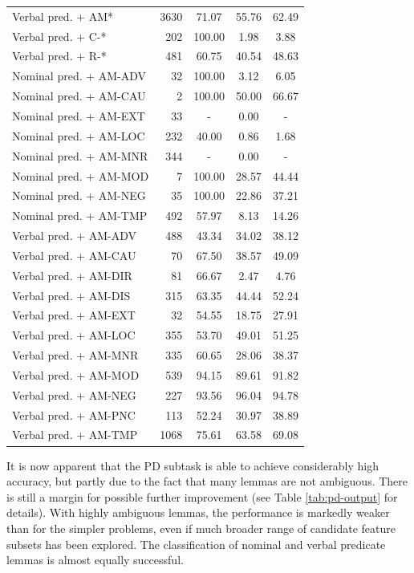 \documentclass[12pt,notitlepage]{report}
\begin{document}
\begin{table}[p]
\begin{center}
\begin{tabular}{|l|r|c|c|c|}
Verbal pred. + AM* & 3630 & 71.07 & 55.76 & 62.49 \\
Verbal pred. + C-* & 202 & 100.00 & 1.98 & 3.88 \\
Verbal pred. + R-* & 481 & 60.75 & 40.54 & 48.63 \\\hline\hline
Nominal pred. + AM-ADV & 32 & 100.00 & 3.12 & 6.05 \\
Nominal pred. + AM-CAU & 2 & 100.00 & 50.00 & 66.67 \\
Nominal pred. + AM-EXT & 33 & - & 0.00 & - \\
Nominal pred. + AM-LOC & 232 & 40.00 & 0.86 & 1.68 \\
Nominal pred. + AM-MNR & 344 & - & 0.00 & - \\
Nominal pred. + AM-MOD & 7 & 100.00 & 28.57 & 44.44 \\
Nominal pred. + AM-NEG & 35 & 100.00 & 22.86 & 37.21 \\
Nominal pred. + AM-TMP & 492 & 57.97 & 8.13 & 14.26 \\\hline
Verbal pred. + AM-ADV & 488 & 43.34 & 34.02 & 38.12 \\
Verbal pred. + AM-CAU & 70 & 67.50 & 38.57 & 49.09 \\
Verbal pred. + AM-DIR & 81 & 66.67 & 2.47 & 4.76 \\
Verbal pred. + AM-DIS & 315 & 63.35 & 44.44 & 52.24 \\
Verbal pred. + AM-EXT & 32 & 54.55 & 18.75 & 27.91 \\
Verbal pred. + AM-LOC & 355 & 53.70 & 49.01 & 51.25 \\
Verbal pred. + AM-MNR & 335 & 60.65 & 28.06 & 38.37 \\
Verbal pred. + AM-MOD & 539 & 94.15 & 89.61 & 91.82 \\
Verbal pred. + AM-NEG & 227 & 93.56 & 96.04 & 94.78 \\
Verbal pred. + AM-PNC & 113 & 52.24 & 30.97 & 38.89 \\
Verbal pred. + AM-TMP & 1068 & 75.61 & 63.58 & 69.08 \\\hline
\end{tabular}
\end{center}
\end{table}

It is now apparent that the PD subtask is able to achieve considerably high accuracy, but partly due to the fact that many lemmas are not ambiguous. There is still a margin for possible further improvement (see Table \ref{tab:pd-output} for details). With highly ambiguous lemmas, the performance is markedly weaker than for the simpler problems, even if much broader range of candidate feature subsets has been explored. The classification of nominal and verbal predicate lemmas is almost equally successful.
\end{document}
